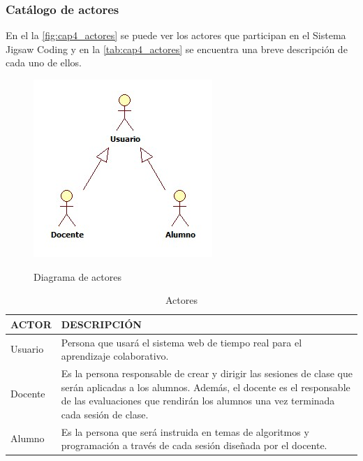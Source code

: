 \subsubsection{Catálogo de actores}
En el la \autoref{fig:cap4_actores} se puede ver los actores que participan en el Sistema Jigsaw Coding y en la \autoref{tab:cap4_actores} se encuentra una breve descripción de cada uno de ellos.
\begin{figure}
	\centering
	\includegraphics[scale=0.6]{figuras/casosdeuso/actores.jpg}\\
	\caption[Diagrama de actores]{Diagrama de actores}
	\label{fig:cap4_actores}
\end{figure}
\clearpage
\begin{longtable}{L{3cm}L{7cm}}
	\caption{Actores}
	\label{tab:cap4_actores}\\
	\toprule[0.8mm]
	ACTOR & DESCRIPCIÓN \\
	\midrule[0.6mm]
	Usuario & Persona que usará el sistema web de tiempo real para el aprendizaje colaborativo.\\
	\midrule
	Docente & Es la persona responsable de crear y dirigir las sesiones de clase que serán aplicadas a los alumnos. Además, el docente es el responsable de las evaluaciones que rendirán los alumnos una vez terminada cada sesión de clase.\\
	\midrule
	Alumno & Es la persona que será instruida en temas de algoritmos y programación a través de cada sesión diseñada por el docente.\\
	\bottomrule[0.8mm]
\end{longtable}

